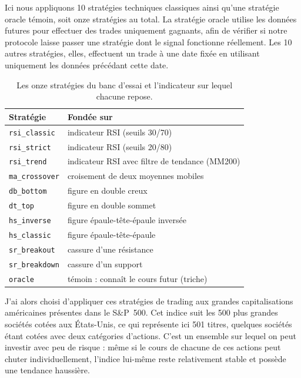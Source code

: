 Ici nous appliquons 10 stratégies techniques classiques ainsi qu'une stratégie
oracle témoin, soit onze stratégies au total.
La stratégie oracle utilise les données futures pour effectuer des
trades uniquement gagnants, afin de vérifier si notre protocole laisse passer
une stratégie dont le signal fonctionne réellement.
Les 10 autres stratégies, elles, effectuent un trade à une date fixée en
utilisant uniquement les données précédant cette date. 

\begin{table}[H]
\centering
\caption{Les onze stratégies du banc d'essai et l'indicateur sur lequel chacune repose.}
\label{tab:strategies}
\renewcommand{\arraystretch}{1.25}
\small
\begin{tabular}{@{}ll@{}}
\toprule
Stratégie & Fondée sur \\
\midrule
\texttt{rsi\_classic}  & indicateur RSI (seuils 30/70) \\
\texttt{rsi\_strict}   & indicateur RSI (seuils 20/80) \\
\texttt{rsi\_trend}    & indicateur RSI avec filtre de tendance (MM200) \\
\texttt{ma\_crossover} & croisement de deux moyennes mobiles \\
\texttt{db\_bottom}    & figure en double creux \\
\texttt{dt\_top}       & figure en double sommet \\
\texttt{hs\_inverse}   & figure épaule-tête-épaule inversée \\
\texttt{hs\_classic}   & figure épaule-tête-épaule \\
\texttt{sr\_breakout}  & cassure d'une résistance \\
\texttt{sr\_breakdown} & cassure d'un support \\
\midrule
\texttt{oracle}        & témoin : connaît le cours futur (triche) \\
\bottomrule
\end{tabular}
\end{table}

J'ai alors choisi d'appliquer ces stratégies de trading aux grandes
capitalisations américaines présentes dans le S\&P~500. Cet indice suit les
500 plus grandes sociétés cotées aux États-Unis, ce qui représente ici
501 titres, quelques sociétés étant cotées avec deux catégories d'actions.
C'est un ensemble sur lequel on peut investir avec peu de risque : même si le
cours de chacune de ces actions peut chuter individuellement, l'indice
lui-même reste relativement stable et possède une tendance haussière.

